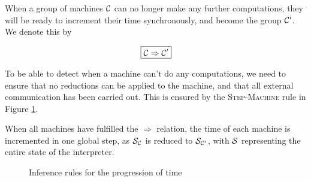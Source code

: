 When a group of machines $\C$ can no longer make any further computations, they
will be ready to increment their time synchronously, and become the group
$\C'$. We denote this by

\[\boxed{\C \Rightarrow \C'}\]

To be able to detect when a machine can't do any computations, we need to
ensure that no reductions can be applied to the machine, and that all external
communication has been carried out. This is ensured by the
\textsc{Step-Machine} rule in Figure \ref{fig:rule:time-step}.

When all machines have fulfilled the $\Rightarrow$ relation, the time of each machine is
incremented in one global step, as $\S_\C$ is reduced to $\S_{\C'}$, with $\S$ representing
the entire state of the interpreter.

\begin{figure}[!h]
\caption{Inference rules for the progression of time}\label{fig:rule:time-step}
\end{figure}

